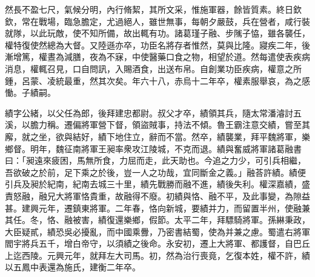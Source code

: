 \begin{pinyinscope}
 
 
 
 然長不盈七尺，氣候分明，內行脩絜，其所文采，惟施軍器，餘皆質素。終日欽欽，常在戰場，臨急膽定，尤過絕人，雖世無事，每朝夕嚴鼓，兵在營者，咸行裝就隊，以此玩敵，使不知所備，故出輒有功。諸葛瑾子融、步隲子恊，雖各襲任，權特復使然總為大督。又陸遜亦卒，功臣名將存者惟然，莫與比隆。寢疾二年，後漸增篤，權晝為減膳，夜為不寐，中使醫藥口食之物，相望於道。然每遣使表疾病消息，權輒召見，口自問訊，入賜酒食，出送布帛。自創業功臣疾病，權意之所鍾，呂蒙、凌統最重，然其次矣。年六十八，赤烏十二年卒，權素服舉哀，為之感慟。子績嗣。
 
 
 
 
 績字公緒，以父任為郎，後拜建忠都尉。叔父才卒，績領其兵，隨太常潘濬討五溪，以膽力稱。遷偏將軍營下督，領盜賊事，持法不傾。魯王霸注意交績，嘗至其廨，就之坐，欲與結好，績下地住立，辭而不當。然卒，績襲業，拜平魏將軍，樂鄉督。明年，魏征南將軍王昶率衆攻江陵城，不克而退。績與奮威將軍諸葛融書曰：「昶遠來疲困，馬無所食，力屈而走，此天助也。今追之力少，可引兵相繼，吾欲破之於前，足下乘之於後，豈一人之功哉，宜同斷金之義。」融荅許績。績便引兵及昶於紀南，紀南去城三十里，績先戰勝而融不進，績後失利。權深嘉績，盛責怒融，融兄大將軍恪貴重，故融得不廢。初績與恪、融不平，及此事變，為隙益甚。建興元年，遷鎮東將軍。二年春，恪向新城，要績并力，而留置半州，使融兼其任。冬，恪、融被害，績復還樂鄉，假節。太平二年，拜驃騎將軍。孫綝秉政，大臣疑貳，績恐吳必擾亂，而中國乘釁，乃密書結蜀，使為并兼之慮。蜀遣右將軍閻宇將兵五千，增白帝守，以須績之後命。永安初，遷上大將軍、都護督，自巴丘上迄西陵。元興元年，就拜左大司馬。初，然為治行喪竟，乞復本姓，權不許，績以五鳳中表還為施氏，建衡二年卒。
 
 
\end{pinyinscope}